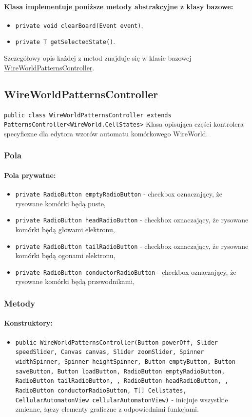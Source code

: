 \documentclass{report}
\begin{document}
\paragraph{Klasa implementuje poniższe metody abstrakcyjne z klasy bazowe:}
\begin{itemize}
 	\item \texttt{private void clearBoard(Event event)},
 	\item \texttt{private T getSelectedState()}.
\end{itemize}
Szczegółowy opis każdej z metod znajduje się w klasie bazowej \hyperref[subsec:cellularAutomaton]{WireWorldPatternsController}.

\subsection{WireWorldPatternsController}
\texttt{public class WireWorldPatternsController extends PatternsController<WireWorld.CellStates>}
Klasa opisująca części kontrolera specyficzne dla edytora wzorów automatu komórkowego WireWorld.
\subsubsection{Pola}
\paragraph{Pola prywatne:}
\begin{itemize}	\label{sec:checkbox}
	\item \texttt{private RadioButton emptyRadioButton} - checkbox oznaczający, że rysowane komórki będą puste,
	\item \texttt{private RadioButton headRadioButton} - checkbox oznaczający, że rysowane komórki będą głowami elektronu,
	\item \texttt{private RadioButton tailRadioButton} - checkbox oznaczający, że rysowane komórki będą ogonami elektronu,
	\item \texttt{private RadioButton conductorRadioButton} - checkbox oznaczający, że rysowane komórki będą przewodnikami,
\end{itemize}

\subsubsection{Metody}
\paragraph{Konstruktory:}
\begin{itemize}
\item \texttt{public WireWorldPatternsController(Button powerOff, Slider speedSlider, Canvas canvas, Slider zoomSlider, Spinner widthSpinner, Spinner heightSpinner, Button emptyButton, Button saveButton, Button loadButton, RadioButton emptyRadioButton, RadioButton tailRadioButton, , RadioButton headRadioButton, , RadioButton conductorRadioButton, T[] Cellstates, CellularAutomatonView cellularAutomatonView)} - inicjuje wszystkie zmienne, łączy elementy graficzne z odpowiednimi funkcjami.
\end{itemize}
\end{document}
